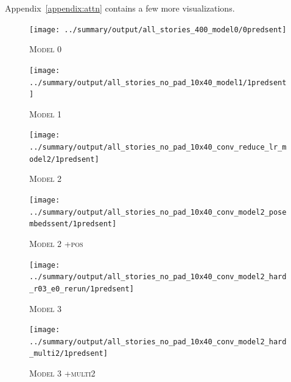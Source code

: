 \documentclass[12pt]{report}
\begin{document}

Appendix~\ref{appendix:attn} contains a few more visualizations.



\begin{figure}[p]
\centering
\texttt{[image: ../summary/output/all\_stories\_400\_model0/0predsent]}
\caption{\textsc{Model 0}}
\end{figure}

\begin{figure}[p]
\centering
\texttt{[image: ../summary/output/all\_stories\_no\_pad\_10x40\_model1/1predsent]}
\caption{\textsc{Model 1}}
\end{figure}

\begin{figure}[p]
\centering
\texttt{[image: ../summary/output/all\_stories\_no\_pad\_10x40\_conv\_reduce\_lr\_model2/1predsent]}
\caption{\textsc{Model 2}}
\end{figure}

\begin{figure}[p]
\centering
\texttt{[image: ../summary/output/all\_stories\_no\_pad\_10x40\_conv\_model2\_posembedssent/1predsent]}
\caption{\textsc{Model 2 +pos}}
\end{figure}

\begin{figure}[p]
\centering
\texttt{[image: ../summary/output/all\_stories\_no\_pad\_10x40\_conv\_model2\_hard\_r03\_e0\_rerun/1predsent]}
\caption{\textsc{Model 3}}
\end{figure}

\begin{figure}[p]
\centering
\texttt{[image: ../summary/output/all\_stories\_no\_pad\_10x40\_conv\_model2\_hard\_multi2/1predsent]}
\caption{\textsc{Model 3 +multi2}}
\end{figure}

\end{document}
